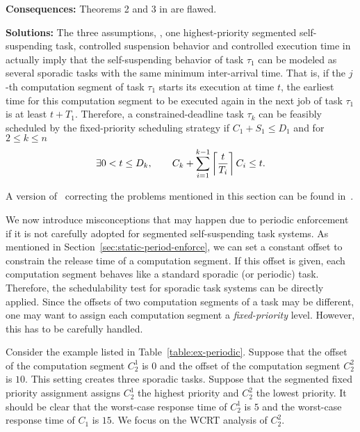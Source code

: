 {\bf Consequences:} Theorems 2 and 3 in \cite{RTSS-KimANR13} are flawed.  

{\bf Solutions:} The three assumptions, \ie, one highest-priority segmented self-suspending task, controlled suspension behavior and controlled execution time  in \cite{RTSS-KimANR13} actually imply that the self-suspending behavior of task $\tau_1$ can be modeled as several sporadic tasks with the same minimum inter-arrival time. That is, if the $j$-th computation segment of task $\tau_1$ starts its execution at time $t$, the earliest time for this computation segment to be executed again in the next job of task $\tau_1$ is at least $t+T_1$. Therefore, a constrained-deadline task $\tau_k$ can be feasibly scheduled by the fixed-priority scheduling strategy if $C_1+S_1 \leq D_1$ and for $2 \leq k \leq n$
  \begin{equation}
    \label{eq:tda-fixed}
\exists 0 < t \leq D_k, \qquad C_k + \sum_{i=1}^{k-1}\left\lceil{\frac{t}{T_i}}\right\rceil C_i \leq t.    
  \end{equation}

A version of~\cite{RTSS-KimANR13} correcting the problems mentioned in this section can be found in~\cite{Kim2016}.

\label{sec:wrong-periodic}

We now introduce misconceptions that may happen due to periodic enforcement if it is not carefully adopted for segmented self-suspending task systems. As mentioned in Section~\ref{sec:static-period-enforce}, we can set a constant offset to constrain the release time of a computation segment. If this offset is given, each computation segment behaves like a standard sporadic (or periodic) task. Therefore, the schedulability test for sporadic task systems can be directly applied. Since the offsets of two computation segments of a task may be different, one may want to assign each computation segment a \emph{fixed-priority} level.  However, this has to be carefully handled. 



Consider the example listed in Table~\ref{table:ex-periodic}. Suppose that the offset of the computation segment $C_2^1$ is $0$ and the offset of the computation segment $C_2^2$ is $10$. This setting creates three sporadic tasks.
Suppose that the segmented fixed priority assignment assigns $C_2^1$ the highest priority and $C_2^2$ the lowest priority. It should be clear that the worst-case response time of $C_2^1$ is $5$ and the worst-case response time of $C_1$ is $15$. We focus on the WCRT analysis of $C_2^2$.


